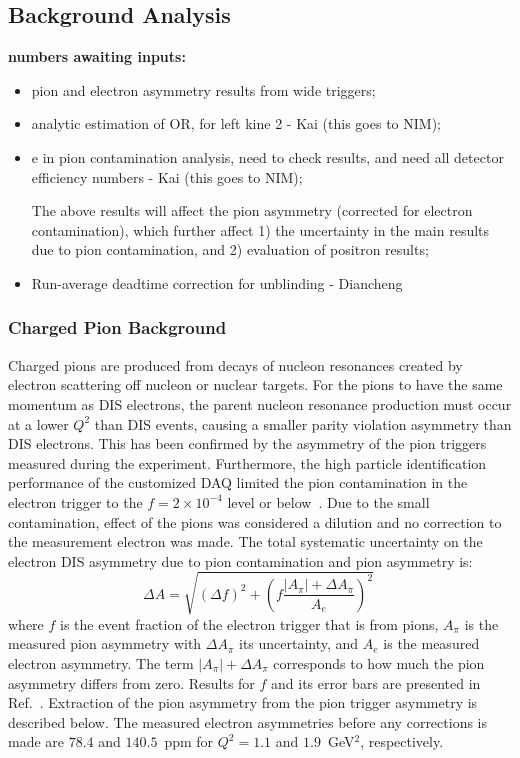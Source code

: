 
\subsection{Background Analysis}\label{sec:ana_allbg}

{\bf numbers awaiting inputs:}

\begin{itemize}
\item pion and electron asymmetry results from wide triggers;

\item analytic estimation of OR, for left kine 2 - Kai (this goes to NIM);

\item e in pion contamination analysis, need to check results, and need all detector efficiency numbers - Kai (this goes to NIM);

The above results will affect the pion asymmetry (corrected for electron contamination), which further affect
1) the uncertainty in the main results due to pion contamination, and 2) evaluation of positron results; 

\item Run-average deadtime correction for unblinding - Diancheng
\end{itemize}

\subsubsection{Charged Pion Background}

Charged pions are produced from decays of nucleon resonances created by 
electron scattering off nucleon or nuclear targets. For the pions to have the same
momentum as DIS electrons, the parent nucleon resonance production must occur at 
a lower $Q^2$ than DIS events, causing a smaller parity violation asymmetry than DIS electrons.
This has been confirmed by the asymmetry of the pion triggers measured during the
experiment. Furthermore, the high particle identification performance of the
customized DAQ limited the pion contamination in the electron trigger to the
$f=2\times 10^{-4}$ level or below~\cite{pvdis_nim}. Due to the small contamination, 
effect of the pions was considered a dilution and no correction to the measurement
electron was made. The total systematic uncertainty on the electron 
DIS asymmetry due to pion contamination and pion asymmetry is:
\begin{equation}
 \Delta A = \sqrt{\left(\Delta f\right)^2+\left(f\frac{\vert{A_\pi}\vert+\Delta A_\pi}{A_e}\right)^2}~\label{eq:pionbg}
\end{equation}
where $f$ is the event fraction of the electron trigger that is from pions, $A_\pi$ is the 
measured pion asymmetry with $\Delta A_\pi$ its uncertainty, and $A_e$ is the measured electron
asymmetry. The term $\vert A_\pi\vert+\Delta A_\pi$ corresponds to how much the pion asymmetry differs
from zero. Results for $f$ and its error bars are presented in Ref.~\cite{pvdis_nim}. Extraction of
the pion asymmetry from the pion trigger asymmetry is described below. 
The measured electron asymmetries before any corrections is
made are $78.4$ and $140.5$~ppm for $Q^2=1.1$ and $1.9$~GeV$^2$, respectively.


